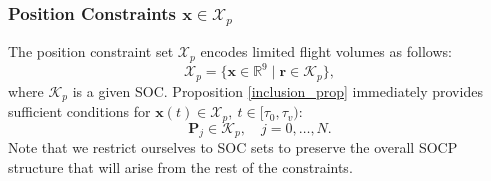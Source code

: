 \documentclass[journal,10pt]{IEEEtran}
\newcommand{\vect}[1]{\boldsymbol{\mathbf{#1}}}
\newif\ifdraft
\newcommand{\XX}[1]{\ifdraft{\color{red}[{\bf XX}: #1]}\fi}
\newcommand{\VF}[1]{\ifdraft{\color{blue}[{\bf VF}: #1]}\fi}
\begin{document}








\subsubsection{Position Constraints $\vect{x}\in\mathcal{X}_p$}
The position constraint set $\mathcal{X}_p$ encodes limited flight volumes as follows:
\begin{equation}\label{const_pos}
    \mathcal{X}_{p} = \{\vect{x}\in\mathbb{R}^9\mid\vect{r} \in \mathcal{K}_p\},
\end{equation}
where $\mathcal{K}_p$ is a given SOC.
Proposition \ref{inclusion_prop} immediately provides sufficient conditions for $\vect{x}(t)\in\mathcal{X}_p,\ t\in[\tau_0,\tau_v)$:
\begin{equation}\label{cp_pos}
    \vect{P}_{j} \in \mathcal{K}_p, \quad j=0,\dots,N.
\end{equation}
Note that we restrict ourselves to SOC sets to preserve the overall SOCP structure that will arise from the rest of the constraints. %
\end{document}
